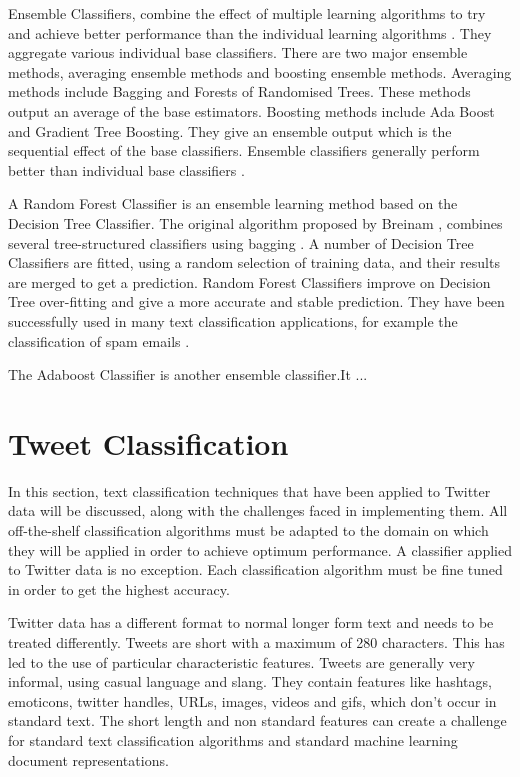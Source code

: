 
Ensemble Classifiers, combine the effect of multiple learning algorithms to try and achieve better performance than the individual learning algorithms \cite{dietterich2000ensemble}. They aggregate various individual base classifiers. There are two major ensemble methods, averaging ensemble methods and boosting ensemble methods. Averaging methods include Bagging and Forests of Randomised Trees. These methods output an average of the base estimators. Boosting methods include Ada Boost and Gradient Tree Boosting. They give an ensemble output which is the sequential effect of the base classifiers. Ensemble classifiers generally perform better than individual base classifiers \cite{Opitz1999}. 

A Random Forest Classifier is an ensemble learning method based on the Decision Tree Classifier. The original algorithm proposed by Breinam \cite{Breiman2001}, combines several tree-structured classifiers using bagging \cite{breiman1996bagging}. A number of Decision Tree Classifiers are fitted, using a random selection of training data, and their results are merged to get a prediction. Random Forest Classifiers improve on Decision Tree over-fitting and give a more accurate and stable prediction. They have been successfully used in many text classification applications, for example the classification of spam emails \cite{akinyelu2014}.

The Adaboost Classifier is another ensemble classifier.It ...

\section{Tweet Classification}

In this section, text classification techniques that have been applied to Twitter data will be discussed, along with the challenges faced in implementing them. All off-the-shelf classification algorithms must be adapted to the domain on which they will be applied in order to achieve optimum performance. A classifier applied to Twitter data is no exception. Each classification algorithm must be fine tuned in order to get the highest accuracy. 

Twitter data has a different format to normal longer form text and needs to be treated differently. Tweets are short with a maximum of 280 characters. This has led to the use of particular characteristic features. Tweets are generally very informal, using casual language and slang. They contain features like hashtags, emoticons, twitter handles, URLs, images, videos and gifs, which don't occur in standard text. The short length and non standard features can create a challenge for standard text classification algorithms and standard machine learning document representations. 

